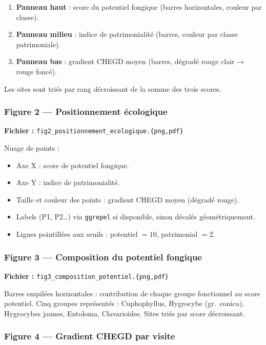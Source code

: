 \documentclass[11pt,a4paper]{article}
\begin{document}
\begin{enumerate}
  \item \textbf{Panneau haut} : score du potentiel fongique (barres horizontales, couleur par classe).
  \item \textbf{Panneau milieu} : indice de patrimonialité (barres, couleur par classe patrimoniale).
  \item \textbf{Panneau bas} : gradient CHEGD moyen (barres, dégradé rouge clair → rouge foncé).
\end{enumerate}

Les sites sont triés par rang décroissant de la somme des trois scores.

\subsubsection{Figure 2 — Positionnement écologique}

\textbf{Fichier :} \texttt{fig2\_positionnement\_ecologique.\{png,pdf\}}

Nuage de points :
\begin{itemize}
  \item Axe X : score de potentiel fongique.
  \item Axe Y : indice de patrimonialité.
  \item Taille et couleur des points : gradient CHEGD moyen (dégradé rouge).
  \item Labels (P1, P2\ldots) via \texttt{ggrepel} si disponible, sinon décalés géométriquement.
  \item Lignes pointillées aux seuils : potentiel $= 10$, patrimonial $= 2$.
\end{itemize}

\subsubsection{Figure 3 — Composition du potentiel fongique}

\textbf{Fichier :} \texttt{fig3\_composition\_potentiel.\{png,pdf\}}

Barres empilées horizontales : contribution de chaque groupe fonctionnel au score potentiel.
Cinq groupes représentés : Cuphophyllus, Hygrocybe (gr.~conica), Hygrocybes jaunes,
Entoloma, Clavarioïdes. Sites triés par score décroissant.

\subsubsection{Figure 4 — Gradient CHEGD par visite}
\end{document}
